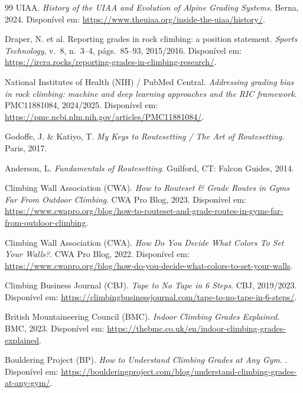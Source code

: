 \begin{thebibliography}{99}
UIAA.
\newblock \textit{History of the UIAA and Evolution of Alpine Grading Systems}.
\newblock Berna, 2024. Disponível em: \url{https://www.theuiaa.org/inside-the-uiaa/history/}.

Draper, N. et al.
\newblock Reporting grades in rock climbing: a position statement.
\newblock \textit{Sports Technology}, v.~8, n.~3--4, págs.~85--93, 2015/2016. Disponível em: \url{https://ircra.rocks/reporting-grades-in-climbing-research/}.

National Institutes of Health (NIH) / PubMed Central.
\newblock \textit{Addressing grading bias in rock climbing: machine and deep learning approaches and the RIC framework}.
\newblock PMC11881084, 2024/2025. Disponível em: \url{https://pmc.ncbi.nlm.nih.gov/articles/PMC11881084/}.

Godoffe, J. \& Katiyo, T.
\newblock \textit{My Keys to Routesetting / The Art of Routesetting}.
\newblock Paris, 2017.

Anderson, L.
\newblock \textit{Fundamentals of Routesetting}.
\newblock Guilford, CT: Falcon Guides, 2014.

Climbing Wall Association (CWA).
\newblock \textit{How to Routeset \& Grade Routes in Gyms Far From Outdoor Climbing}.
\newblock CWA Pro Blog, 2023. Disponível em: \url{https://www.cwapro.org/blog/how-to-routeset-and-grade-routes-in-gyms-far-from-outdoor-climbing}.

Climbing Wall Association (CWA).
\newblock \textit{How Do You Decide What Colors To Set Your Walls?}.
\newblock CWA Pro Blog, 2022. Disponível em: \url{https://www.cwapro.org/blog/how-do-you-decide-what-colors-to-set-your-walls}.

Climbing Business Journal (CBJ).
\newblock \textit{Tape to No Tape in 6 Steps}.
\newblock CBJ, 2019/2023. Disponível em: \url{https://climbingbusinessjournal.com/tape-to-no-tape-in-6-steps/}.

British Mountaineering Council (BMC).
\newblock \textit{Indoor Climbing Grades Explained}.
\newblock BMC, 2023. Disponível em: \url{https://thebmc.co.uk/en/indoor-climbing-grades-explained}.

Bouldering Project (BP).
\newblock \textit{How to Understand Climbing Grades at Any Gym}.
. Disponível em: \url{https://boulderingproject.com/blog/understand-climbing-grades-at-any-gym/}.


\end{thebibliography}
